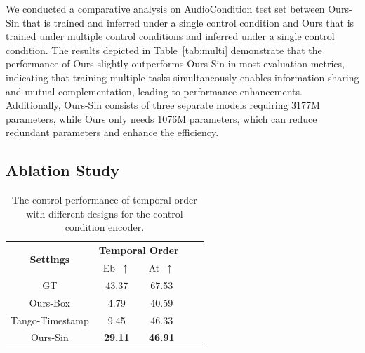 \documentclass[letterpaper]{article} %
\begin{document}
We conducted a comparative analysis on AudioCondition test set between Ours-Sin that is trained and inferred under a single control condition and Ours that is trained under multiple control conditions and inferred under a single control condition. The results depicted in Table~\ref{tab:multi} demonstrate that the performance of Ours slightly outperforms
Ours-Sin in most evaluation metrics, indicating that training multiple tasks simultaneously enables information sharing and mutual complementation, leading to performance enhancements. Additionally, Ours-Sin consists of three separate models requiring 3177M parameters, while Ours only needs 1076M parameters, which can reduce redundant parameters and enhance the efficiency.

\subsection{Ablation Study}

\begin{table}[!h]\footnotesize
    \centering
    \caption{The control performance of temporal order with different designs for the control condition encoder.}
    \label{tab:ablation control condition encoder}
        \begin{tabular}{c|cccc}
        \toprule
        \multirow{2}{*}{\textbf{Settings}} & \multicolumn{2}{c}{\textbf{Temporal Order}} \\
         & Eb~$\uparrow$ & At~$\uparrow$  \\
        \midrule
        \midrule
         GT & 43.37 & 67.53\\
         \midrule
         Ours-Box & 4.79 & 40.59 \\
         Tango-Timestamp & 9.45 & 46.33 \\
         Ours-Sin & \textbf{29.11} & \textbf{46.91} \\
        \bottomrule
        \end{tabular}
\end{table}
\end{document}
